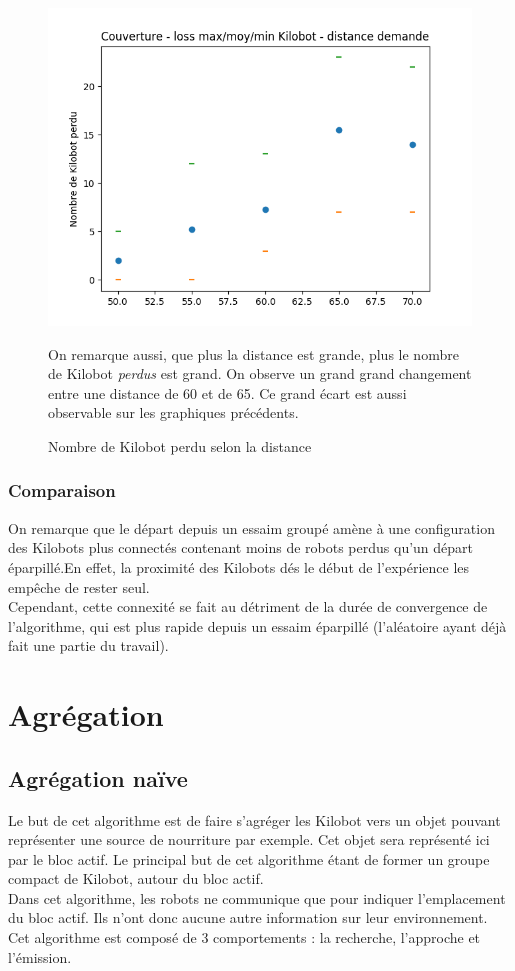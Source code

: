 \documentclass[a4paper]{article}
\begin{document}
\begin{figure}[h!]
	\begin{minipage}[c]{.46\linewidth}
		\centering
	\includegraphics[width=1.1\linewidth]{../../script_results/Couverture_loss_kilobot.png}
	\caption{Nombre de Kilobot perdu selon la distance}
	\end{minipage}
	\begin{minipage}[c]{.46\linewidth}
	On remarque aussi, que plus la distance est grande, plus le nombre de Kilobot \textit{perdus} est grand. On observe un grand grand changement entre une distance de 60 et de 65. Ce grand écart est aussi observable sur les graphiques précédents.
	\end{minipage}
\end{figure}
\newpage
\subsubsection{Comparaison}
On remarque que le départ depuis un essaim groupé amène à une configuration des Kilobots plus connectés contenant moins de robots perdus qu'un départ éparpillé.En effet, la proximité des Kilobots dés le début de l'expérience les empêche de rester seul.\\ Cependant, cette connexité se fait au détriment de la durée de convergence de l'algorithme, qui est plus rapide depuis un essaim éparpillé (l'aléatoire ayant déjà fait une partie du travail).
\newpage
\section{Agrégation}
\subsection{Agrégation naïve}
Le but de cet algorithme est de faire s'agréger les Kilobot vers un objet  pouvant représenter une source de nourriture par exemple. Cet objet sera représenté ici par le bloc actif. Le principal but de cet algorithme étant de former un groupe compact de Kilobot, autour du bloc actif.\\
Dans cet algorithme, les robots ne communique que pour indiquer l'emplacement du bloc actif. Ils n'ont donc aucune autre information sur leur environnement. Cet algorithme est composé de 3 comportements : la recherche, l'approche et l'émission.\\
\end{document}
